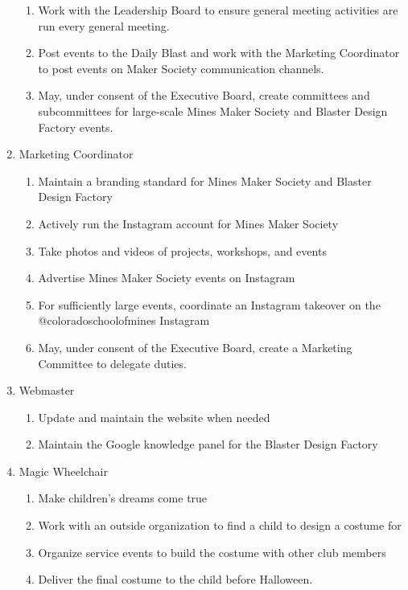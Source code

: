 \documentclass[12pt,letterpaper]{article}
\begin{document}
\begin{enumerate}
\begin{enumerate}
        \item Work with the Leadership Board to ensure general meeting activities are run every general meeting. 
        \item Post events to the Daily Blast and work with the Marketing Coordinator to post events on Maker Society communication channels.
        \item May, under consent of the Executive Board, create committees and subcommittees for large-scale Mines Maker Society and Blaster Design Factory events.
    \end{enumerate}
    \item Marketing Coordinator 
    \begin{enumerate}
        \item Maintain a branding standard for Mines Maker Society and Blaster Design Factory
        \item Actively run the Instagram account for Mines Maker Society
        \item Take photos and videos of projects, workshops, and events
        \item Advertise Mines Maker Society events on Instagram
        \item For sufficiently large events, coordinate an Instagram takeover on the @coloradoschoolofmines Instagram
        \item May, under consent of the Executive Board, create a Marketing Committee to delegate duties.
    \end{enumerate}
    \item Webmaster 
    \begin{enumerate}
        \item Update and maintain the website when needed
        \item Maintain the Google knowledge panel for the Blaster Design Factory
    \end{enumerate}
    \item Magic Wheelchair 
    \begin{enumerate}
        \item Make children’s dreams come true
        \item Work with an outside organization to find a child to design a costume for
        \item Organize service events to build the costume with other club members 
        \item Deliver the final costume to the child before Halloween.
    \end{enumerate}

\end{enumerate}
\end{document}
